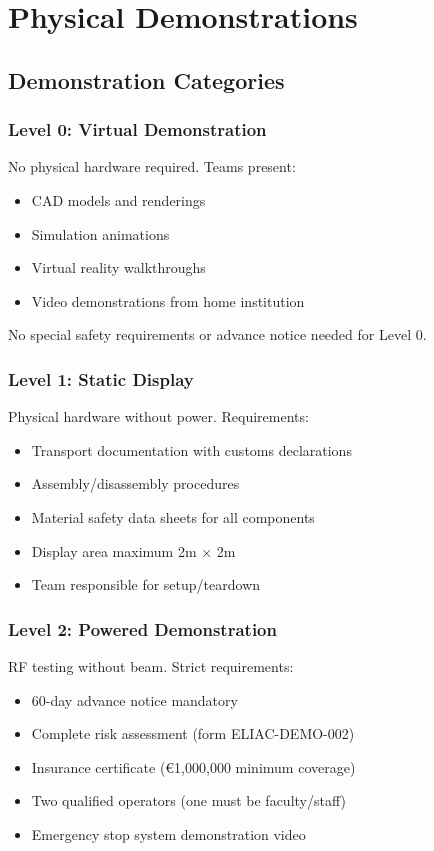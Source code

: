 
\renewcommand{\thesection}{PD}
\section{Physical Demonstrations}

\subsection{Demonstration Categories}

\subsubsection{Level 0: Virtual Demonstration}
No physical hardware required. Teams present:
\begin{itemize}[noitemsep]
    \item CAD models and renderings
    \item Simulation animations
    \item Virtual reality walkthroughs
    \item Video demonstrations from home institution
\end{itemize}

No special safety requirements or advance notice needed for Level 0.

\subsubsection{Level 1: Static Display}
Physical hardware without power. Requirements:
\begin{itemize}[noitemsep]
    \item Transport documentation with customs declarations
    \item Assembly/disassembly procedures
    \item Material safety data sheets for all components
    \item Display area maximum 2m × 2m
    \item Team responsible for setup/teardown
\end{itemize}

\subsubsection{Level 2: Powered Demonstration}
RF testing without beam. Strict requirements:
\begin{itemize}[noitemsep]
    \item 60-day advance notice mandatory
    \item Complete risk assessment (form ELIAC-DEMO-002)
    \item Insurance certificate (€1,000,000 minimum coverage)
    \item Two qualified operators (one must be faculty/staff)
    \item Emergency stop system demonstration video
\end{itemize}

